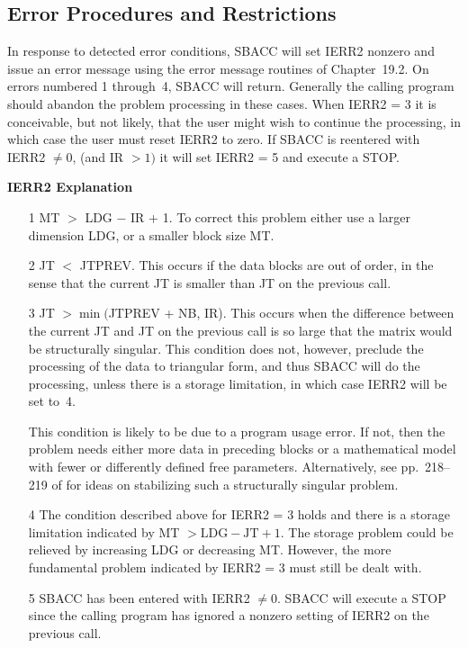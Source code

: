 \documentclass[twoside]{MATH77}
\begin{document}



\subsection{Error Procedures and Restrictions}

In response to detected error conditions, SBACC will set IERR2 nonzero and
issue an error message using the error message routines of Chapter~19.2. On
errors numbered 1 through~4, SBACC will return. Generally the calling program
should abandon the problem processing in these cases. When IERR2 = 3 it is
conceivable, but not likely, that the user might wish to continue the
processing, in which case the user must reset IERR2 to zero. If SBACC is
reentered with IERR2 $\neq 0$, (and IR $> 1)$ it will set IERR2 = 5 and
execute a STOP.

{\bf IERR2 \hspace{.2 in} Explanation}\vspace{-10pt}
\begin{itemize}
\item[1]  MT $>$ LDG $-$ IR + 1. To correct this problem either use a
larger dimension LDG, or a smaller block size MT.

\item[2]  JT $<$ JTPREV. This occurs if the data blocks are out of order, in
the sense that the current JT is smaller than JT on the previous call.

\item[3]  JT $>\min ($JTPREV + NB, IR). This occurs when the difference
between the current JT and JT on the previous call is so large that the
matrix would be structurally singular. This condition does not, however,
preclude the processing of the data to triangular form, and thus SBACC will
do the processing, unless there is a storage limitation, in which case IERR2
will be set to~4.

This condition is likely to be due to a program usage error.  If not, then
the problem needs either more data in preceding blocks or a mathematical
model with fewer or differently defined free parameters.  Alternatively,
see pp.~218--219 of \cite{Lawson:1974:SLS} for ideas on stabilizing such a
structurally singular problem.

\item[4]  The condition described above for IERR2 = 3 holds and there is a
storage limitation indicated by MT $>\text{LDG}-\text{JT}+1$. The storage
problem could be relieved by increasing LDG or decreasing MT. However, the
more fundamental problem indicated by IERR2 = 3 must still be dealt with.

\item[5]  SBACC has been entered with IERR2 $\neq 0$. SBACC will execute a
STOP since the calling program has ignored a nonzero setting of IERR2 on the
previous call.
\end{itemize}
\end{document}
